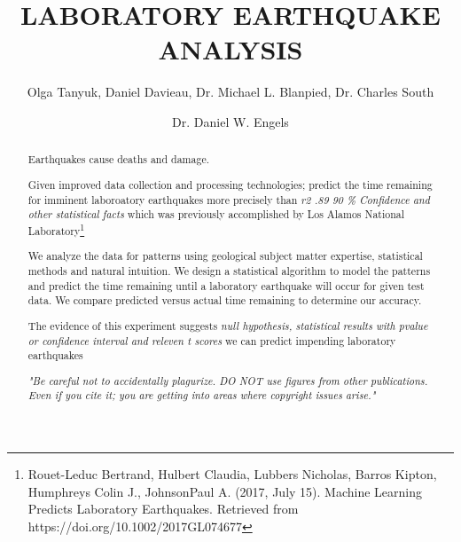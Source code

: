 \documentclass[]{llncs}
\begin{document}
%
\frontmatter          %
%
\pagestyle{headings}  %
%
\title{LABORATORY EARTHQUAKE ANALYSIS}
\author{Olga Tanyuk, Daniel Davieau, Dr. Michael L. Blanpied, Dr. Charles South \and Dr. Daniel W. Engels}



\maketitle
%
\begin{abstract}
Earthquakes cause deaths and damage. \par

Given improved data collection and processing technologies; predict the time remaining for imminent laboroatory earthquakes more precisely than {\em r2 .89 90 \% Confidence and other statistical facts} which was previously accomplished by Los Alamos National Laboratory\footnote{Rouet-Leduc Bertrand, Hulbert Claudia, Lubbers Nicholas, Barros Kipton, Humphreys Colin J., JohnsonPaul A. (2017, July 15). Machine Learning Predicts Laboratory Earthquakes. Retrieved from https://doi.org/10.1002/2017GL074677}


We analyze the data for patterns using geological subject matter expertise, statistical methods and natural intuition. We design a statistical algorithm to model the patterns and predict the time remaining until a laboratory earthquake will occur for given test data. We compare predicted versus actual time remaining to determine our accuracy. \par

The evidence of this experiment suggests  {\em null hypothesis, statistical results with pvalue or confidence interval and releven t scores} we can predict impending laboratory earthquakes

{\em "Be careful not to accidentally plagurize. DO NOT use figures from other publications. Even if you cite it; you are getting into areas where copyright issues arise."}

%
\end{abstract}
%
\end{document}
